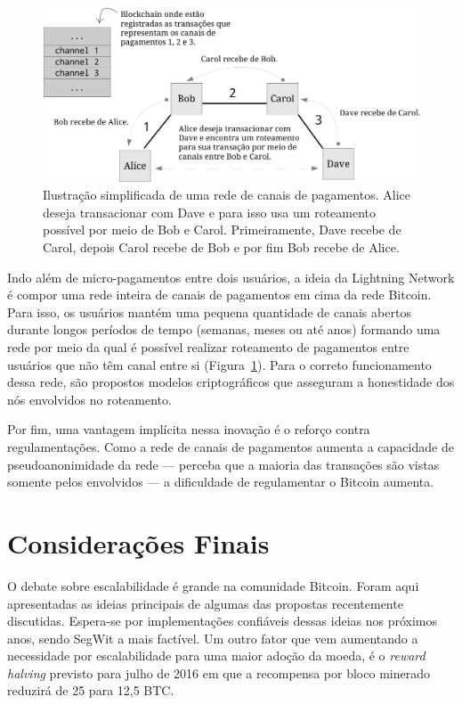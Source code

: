 \begin{figure}[h!]
	\centering
	\includegraphics[scale=0.9]{./images/lightning-network.pdf}
	\caption[Ilustração simplificada de uma rede de canais de pagamentos.]{Ilustração simplificada de uma rede de canais de pagamentos. Alice deseja transacionar com Dave e para isso usa um roteamento possível por meio de Bob e Carol. Primeiramente, Dave recebe de Carol, depois Carol recebe de Bob e por fim Bob recebe de Alice. \label{fig:lightning-network}}
\end{figure}

\newpage
Indo além de micro-pagamentos entre dois usuários, a ideia da Lightning Network é compor uma rede inteira de canais de pagamentos em cima da rede Bitcoin. Para isso, os usuários mantém uma pequena quantidade de canais abertos durante longos períodos de tempo (semanas, meses ou até anos) formando uma rede por meio da qual é possível realizar roteamento de pagamentos entre usuários que não têm canal entre si (Figura~\ref{fig:lightning-network}). Para o correto funcionamento dessa rede, são propostos modelos criptográficos que asseguram a honestidade dos nós envolvidos no roteamento.

Por fim, uma vantagem implícita nessa inovação é o reforço contra regulamentações. Como a rede de canais de pagamentos aumenta a capacidade de pseudoanonimidade da rede --- perceba que a maioria das transações são vistas somente pelos envolvidos --- a dificuldade de regulamentar o Bitcoin aumenta.

\section{Considerações Finais}

O debate sobre escalabilidade é grande na comunidade Bitcoin. Foram aqui apresentadas as ideias principais de algumas das propostas recentemente discutidas. Espera-se por implementações confiáveis dessas ideias nos próximos anos, sendo SegWit a mais factível. Um outro fator que vem aumentando a necessidade por escalabilidade para uma maior adoção da moeda, é o \textit{reward halving} previsto para julho de 2016 em que a recompensa por bloco minerado reduzirá de 25 para 12,5 BTC.